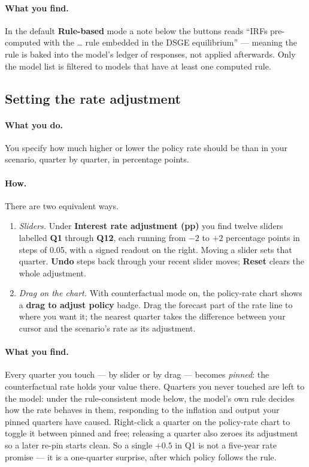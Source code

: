 \documentclass[11pt]{article}
\theoremstyle{definition}
\theoremstyle{remark}
\begin{document}
\paragraph{What you find.} In the default \textbf{Rule-based} mode a note
below the buttons reads ``IRFs pre-computed with the \ldots{} rule embedded in
the DSGE equilibrium'' --- meaning the rule is baked into the model's ledger of
responses, not applied afterwards. Only the model list is filtered to models
that have at least one computed rule.

\subsection{Setting the rate adjustment}

\paragraph{What you do.} You specify how much higher or lower the policy rate
should be than in your scenario, quarter by quarter, in percentage points.

\paragraph{How.} There are two equivalent ways.
\begin{enumerate}
  \item \emph{Sliders.} Under \textbf{Interest rate adjustment (pp)} you find
    twelve sliders labelled \textbf{Q1} through \textbf{Q12}, each running
    from $-2$ to $+2$ percentage points in steps of 0.05, with a signed
    readout on the right. Moving a slider sets that quarter. \textbf{Undo}
    steps back through your recent slider moves; \textbf{Reset} clears the
    whole adjustment.
  \item \emph{Drag on the chart.} With counterfactual mode on, the policy-rate
    chart shows a \textbf{drag to adjust policy} badge. Drag the forecast
    part of the rate line to where you want it; the nearest quarter takes the
    difference between your cursor and the scenario's rate as its adjustment.
\end{enumerate}

\paragraph{What you find.} Every quarter you touch --- by slider or by drag
--- becomes \emph{pinned}: the counterfactual rate holds your value there.
Quarters you never touched are left to the model: under the rule-consistent
mode below, the model's own rule decides how the rate behaves in them,
responding to the inflation and output your pinned quarters have caused.
Right-click a quarter on the policy-rate chart to toggle it between pinned
and free; releasing a quarter also zeroes its adjustment so a later re-pin
starts clean. So a single $+0.5$ in Q1 is not a five-year rate promise ---
it is a one-quarter surprise, after which policy follows the rule.
\end{document}
